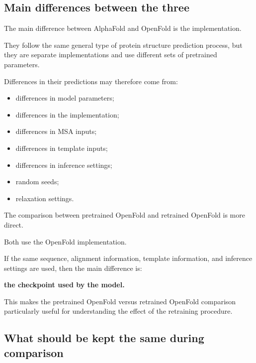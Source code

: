 \documentclass[11pt,a4paper]{article}
\begin{document}
\subsection{Main differences between the three}

The main difference between AlphaFold and OpenFold is the implementation.

They follow the same general type of protein structure prediction process, but they are separate implementations and use different sets of pretrained parameters.

Differences in their predictions may therefore come from:

\begin{itemize}[leftmargin=*]

    \item differences in model parameters;

    \item differences in the implementation;

    \item differences in MSA inputs;

    \item differences in template inputs;

    \item differences in inference settings;

    \item random seeds;

    \item relaxation settings.

\end{itemize}

The comparison between pretrained OpenFold and retrained OpenFold is more direct.

Both use the OpenFold implementation.

If the same sequence, alignment information, template information, and inference settings are used, then the main difference is:

\begin{center}
\textbf{the checkpoint used by the model.}
\end{center}

This makes the pretrained OpenFold versus retrained OpenFold comparison particularly useful for understanding the effect of the retraining procedure.


\subsection{What should be kept the same during comparison}
\end{document}
